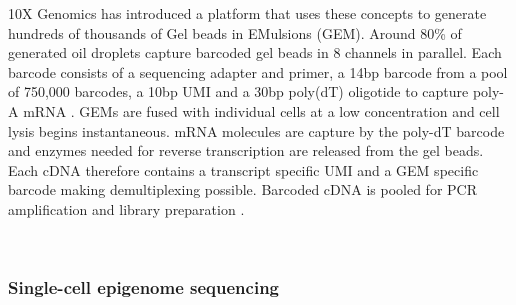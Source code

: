 10X Genomics\texttrademark{} has introduced a platform that uses these concepts to generate hundreds of thousands of Gel beads in EMulsions (GEM). Around 80\% of generated oil droplets capture barcoded gel beads in 8 channels in parallel. Each barcode consists of a sequencing adapter and primer, a 14bp barcode from a pool of 750,000 barcodes, a 10bp UMI and a 30bp poly(dT) oligotide to capture poly-A mRNA \citep{Zheng2017}. GEMs are fused with individual cells at a low concentration and cell lysis begins instantaneous. mRNA molecules are capture by the poly-dT barcode and enzymes needed for reverse transcription are released from the gel beads. Each cDNA therefore contains a transcript specific UMI and a GEM specific barcode making demultiplexing possible. Barcoded cDNA is pooled for PCR amplification and library preparation \citep{Zheng2017}.


\\





\subsubsection{Single-cell epigenome sequencing}

